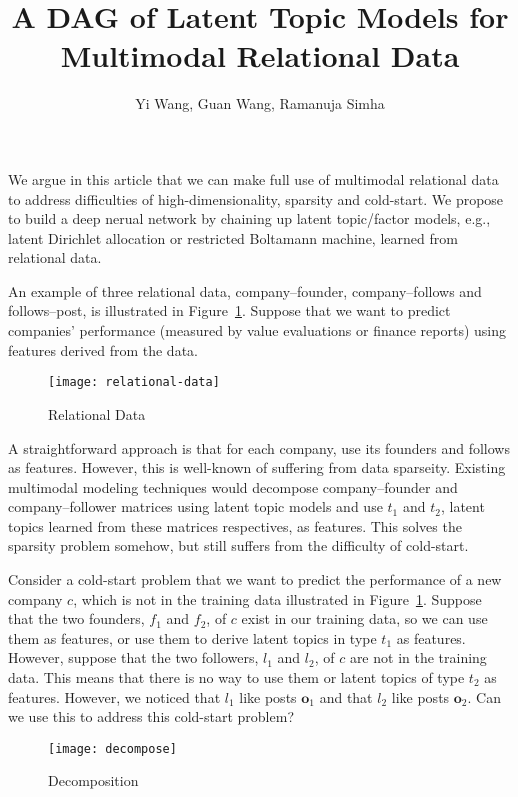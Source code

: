 \documentclass{article}
\newcommand{\V}[1]{\mathbf{#1}}
\begin{document}
\title{A DAG of Latent Topic Models for Multimodal Relational Data}
\author{Yi Wang, Guan Wang, Ramanuja Simha}
\maketitle

We argue in this article that we can make full use of multimodal
relational data to address difficulties of high-dimensionality,
sparsity and cold-start.  We propose to build a deep nerual network by
chaining up latent topic/factor models, e.g., latent Dirichlet
allocation or restricted Boltamann machine, learned from relational
data.

An example of three relational data, company--founder,
company--follows and follows--post, is illustrated in
Figure~\ref{fig:relational-data}.  Suppose that we want to predict
companies' performance (measured by value evaluations or finance
reports) using features derived from the data.

\begin{figure}
  \centering
  \texttt{[image: relational-data]}
  \caption{Relational Data}
  \label{fig:relational-data}
\end{figure}

A straightforward approach is that for each company, use its founders
and follows as features.  However, this is well-known of suffering
from data sparseity.  Existing multimodal modeling techniques would
decompose company--founder and company--follower matrices using latent
topic models and use $t_1$ and $t_2$, latent topics learned from these
matrices respectives, as features.  This solves the sparsity problem
somehow, but still suffers from the difficulty of cold-start.

Consider a cold-start problem that we want to predict the performance
of a new company $c$, which is not in the training data illustrated in
Figure~\ref{fig:relational-data}.  Suppose that the two founders,
$f_1$ and $f_2$, of $c$ exist in our training data, so we can use them
as features, or use them to derive latent topics in type $t_1$ as
features.  However, suppose that the two followers, $l_1$ and $l_2$,
of $c$ are not in the training data.  This means that there is no way
to use them or latent topics of type $t_2$ as features.  However, we
noticed that $l_1$ like posts $\V{o}_1$ and that $l_2$ like posts
$\V{o}_2$.  Can we use this to address this cold-start problem?

\begin{figure}[t]
  \centering
  \texttt{[image: decompose]}
  \caption{Decomposition}
  \label{fig:decompose}
\end{figure}
\end{document}
